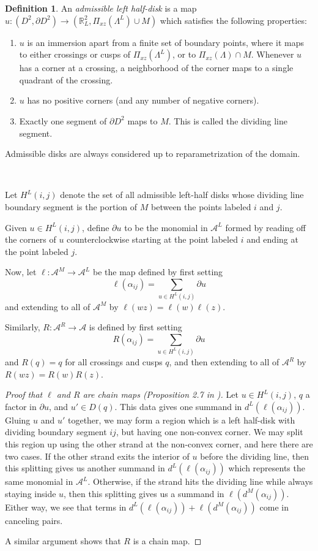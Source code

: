 \documentclass[a4paper,final, reqno]{amsart}
\theoremstyle{plain}
\theoremstyle{definition}
\newtheorem{Def}[Th]{Definition}
\newcommand{\A}{\mathcal{A}}
\begin{document}
	\begin{Def}
		An \emph{admissible left half-disk} is a map $u: (D^2, \partial D^2) \to (\mathbb{R}^2_L, \Pi_{xz}(\Lambda^L) \cup M)$ which satisfies the following properties:
		
		\begin{enumerate}
			\item $u$ is an immersion apart from a finite set of boundary points, where it maps to either crossings or cusps of $\Pi_{xz}(\Lambda^L)$, or to $\Pi_{xz}(\Lambda) \cap M$. Whenever $u$ has a corner at a crossing, a neighborhood of the corner maps to a single quadrant of the crossing.
			\item $u$ has no positive corners (and any number of negative corners).
			\item Exactly one segment of $\partial D^2$ maps to $M$. This is called the dividing line segment.
		\end{enumerate}
		
		Admissible disks are always considered up to reparametrization of the domain.
		
		\-\
		
		Let $H^L(i,j)$ denote the set of all admissible left-half disks whose dividing line boundary segment is the portion of $M$ between the points labeled $i$ and $j$. 
		
		
		Given $u \in H^L(i,j)$, define $\partial u$ to be the monomial in $\A^L$ formed by reading off the corners of $u$ counterclockwise starting at the point labeled $i$ and ending at the point labeled $j$.
	\end{Def}
	
		
	
	Now, let $\ell: \A^M \to \A^L$ be the map defined by first setting
	\[ \ell(\alpha_{ij}) = \sum_{u\in H^L(i,j)} \partial u \]
	and extending to all of $\A^M$ by $\ell(wz) = \ell(w)\ell(z)$. 
	
	Similarly, $R: \A^R \to \A$ is defined by first setting
	\[ R(\alpha_{ij}) = \sum_{u\in H^L(i,j)} \partial u \]
	and $R(q) = q$ for all crossings and cusps $q$, and then extending to all of $\A^R$ by $R(wz)=R(w)R(z)$. 
	
	
	\begin{proof}[Proof that $\ell$ and $R$ are chain maps (Proposition 2.7 in \cite{sivek})]
		Let $u \in H^L(i,j)$, $q$ a factor in $\partial u$, and $u' \in D(q)$. This data gives one summand in $d^L(\ell(\alpha_{ij}))$. Gluing $u$ and $u'$ together, we may form a region which is a left half-disk with dividing boundary segment $ij$, but having one non-convex corner. We may split this region up using the other strand at the non-convex corner, and here there are two cases. If the other strand exits the interior of $u$ before the dividing line, then this splitting gives us another summand in $d^L(\ell(\alpha_{ij}))$ which represents the same monomial in $\A^L$. Otherwise, if the strand hits the dividing line while always staying inside $u$, then this splitting gives us a summand in $\ell(d^M(\alpha_{ij}))$. Either way, we see that terms in $d^L(\ell(\alpha_{ij})) + \ell(d^M(\alpha_{ij}))$ come in canceling pairs.
		
		A similar argument shows that $R$ is a chain map.
	\end{proof}
	
\end{document}
